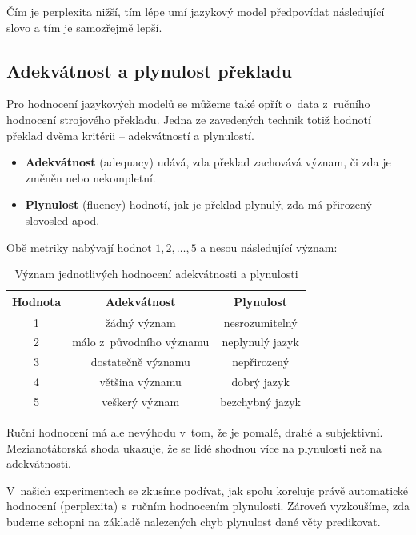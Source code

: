 \documentclass[12pt,a4paper]{report}
\begin{document}
Čím je perplexita nižší, tím lépe umí jazykový model předpovídat následující slovo a tím je samozřejmě lepší.

\subsection{Adekvátnost a plynulost překladu}
Pro hodnocení jazykových modelů se můžeme také opřít o~data z~ručního hodnocení strojového překladu. Jedna ze zavedených technik totiž hodnotí překlad dvěma kritérii  -- adekvátností a plynulostí.

\begin{itemize}
\item{\textbf{Adekvátnost} (adequacy) udává, zda překlad zachovává význam, či zda je změněn nebo nekompletní.}
\item{\textbf{Plynulost} (fluency) hodnotí, jak je překlad plynulý, zda má přirozený slovosled apod.}
\end{itemize}

Obě metriky nabývají hodnot $1, 2, \ldots, 5$ a nesou následující význam:

\begin{table}[!htbp]
\begin{center}\begin{tabular}{|c|c|c|}
\hline
\textbf{Hodnota} & \textbf{Adekvátnost} & \textbf{Plynulost}\\
\hline
1 & žádný význam & nesrozumitelný \\
\hline
2 & málo z~původního významu & neplynulý jazyk \\
\hline
3 & dostatečně významu & nepřirozený \\
\hline
4 & většina významu & dobrý jazyk \\
\hline
5 & veškerý význam & bezchybný jazyk \\
\hline
\end{tabular}
\caption{Význam jednotlivých hodnocení adekvátnosti a plynulosti}\label{tb:vyznamflad}
\end{center}\end{table}

Ruční hodnocení má ale nevýhodu v~tom, že je pomalé, drahé a subjektivní. Mezianotátorská shoda ukazuje, že se lidé shodnou více na plynulosti než na adekvátnosti.

V~našich experimentech se zkusíme podívat, jak spolu koreluje právě automatické hodnocení (perplexita) s~ručním hodnocením plynulosti. Zároveň vyzkoušíme, zda budeme schopni na základě nalezených chyb plynulost dané věty predikovat.
\end{document}

